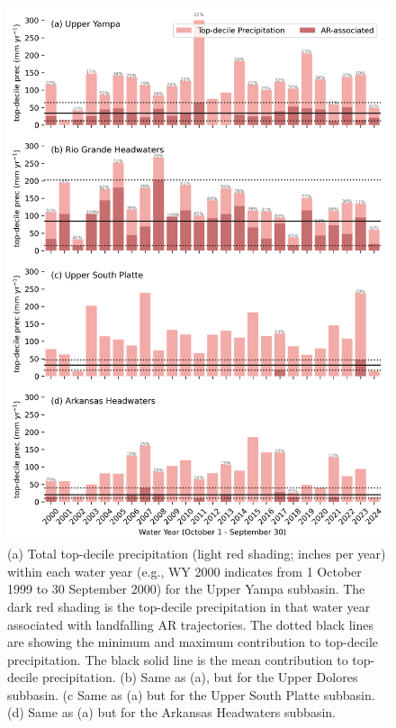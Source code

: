 \documentclass[draft]{agujournal2019}
\begin{document}
\begin{figure}
\noindent\includegraphics[width=\textwidth, height=\textheight, keepaspectratio]{fig9.png}

\caption{(a) Total top-decile precipitation (light red shading; inches per year) within each water year (e.g., WY 2000 indicates from 1 October 1999 to 30 September 2000) for the Upper Yampa subbasin. The dark red shading is the top-decile precipitation in that water year associated with landfalling AR trajectories. The dotted black lines are showing the minimum and maximum contribution to top-decile precipitation. The black solid line is the mean contribution to top-decile precipitation. (b) Same as (a), but for the Upper Dolores subbasin. (c Same as (a) but for the Upper South Platte subbasin. (d) Same as (a) but for the Arkansas Headwaters subbasin.}
\label{fig:time_series}
\end{figure}
\end{document}
